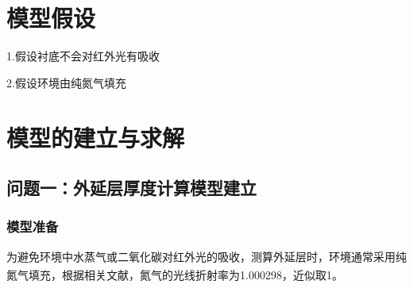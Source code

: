\documentclass[UTF8]{ctexart}
\begin{document}
\section{模型假设}
1.假设衬底不会对红外光有吸收\par
2.假设环境由纯氮气填充\par
\newpage
\section{模型的建立与求解}
\subsection{问题一：外延层厚度计算模型建立}
\subsubsection{模型准备}
为避免环境中水蒸气或二氧化碳对红外光的吸收，测算外延层时，环境通常采用纯氮气填充，根据相关文献，氮气的光线折射率为1.000298\textsuperscript{\cite{2}}，近似取1。\par 
\end{document}
